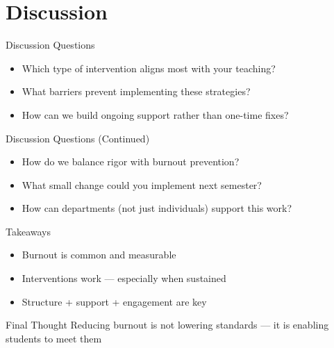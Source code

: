 \documentclass[dvipsnames]{beamer}
\begin{document}
\section{Discussion}

\begin{frame}{Discussion Questions}
\begin{itemize}
    \item Which type of intervention aligns most with your teaching?
    \item What barriers prevent implementing these strategies?
    \item How can we build ongoing support rather than one-time fixes?
\end{itemize}
\end{frame}


\begin{frame}{Discussion Questions (Continued)}
\begin{itemize}
    \item How do we balance rigor with burnout prevention?
    \item What small change could you implement next semester?
    \item How can departments (not just individuals) support this work?
\end{itemize}
\end{frame}


\begin{frame}{Takeaways}
\begin{itemize}
    \item Burnout is common and measurable
    \item Interventions work — especially when sustained
    \item Structure + support + engagement are key
\end{itemize}



\begin{block}{Final Thought}
Reducing burnout is not lowering standards — it is enabling students to meet them
\end{block}

\end{frame}

\end{document}
